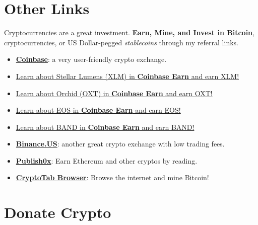 \section*{Other Links}
\noindent Cryptocurrencies are a great investment. {\bf Earn, Mine, and Invest in Bitcoin}, cryptocurrencies, or US Dollar-pegged {\em stablecoins} through my referral links.
\begin{itemize}
   \item \href{https://www.coinbase.com/join/landqu_e}{{\bf Coinbase}}: a very user-friendly crypto exchange.
   \item \href{https://coinbase.com/earn/xlm/invite/cq8rgxt4}{Learn about Stellar Lumens (XLM) in {\bf Coinbase Earn} and earn XLM!}
   \item \href{https://coinbase.com/earn/oxt/invite/39h7v158}{Learn about Orchid (OXT) in {\bf Coinbase Earn} and earn OXT!}
   \item \href{https://coinbase.com/earn/eos/invite/8b95vgnx}{Learn about EOS in {\bf Coinbase Earn} and earn EOS!}
   \item \href{https://coinbase.com/earn/band/invite/2s49zc65}{Learn about BAND in {\bf Coinbase Earn} and earn BAND!}
   \item \href{https://www.binance.us/?ref=35061022}{{\bf Binance.US}}: another great crypto exchange with low trading fees.
   \item \href{https://www.publish0x.com?a=Jxbo2qkAag}{{\bf Publish0x}}: Earn Ethereum and other cryptos by reading.
   \item \href{https://cryptotabbrowser.com/16356908}{{\bf CryptoTab Browser}}: Browse the internet and mine Bitcoin!
\end{itemize}

\section*{Donate Crypto}

